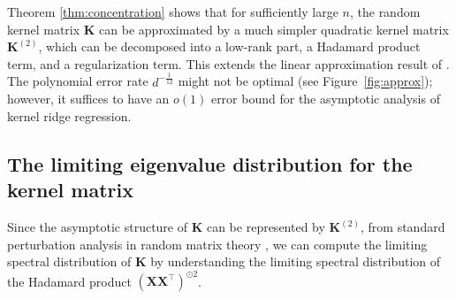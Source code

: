 \documentclass[twoside,11pt]{article}
\def\bK{{\boldsymbol K}}
\def\bX{{\boldsymbol X}}
\renewcommand{\bK}{\boldsymbol{K}}
\newcommand{\1}{\mathbf{1}}
\def\tran{^\top}
\begin{document}
Theorem \ref{thm:concentration} shows that for sufficiently large $n$, the random kernel matrix $\bK$ can be approximated by a much simpler quadratic kernel matrix $\bK^{(2)}$, which can be decomposed into a low-rank part, a Hadamard product term, and a regularization term. This extends the linear approximation result of \cite{el2010spectrum,couillet2016kernel,bartlett2021deep,sahraee2022kernel,ardakan2022equivalence,couillet2022random}. The polynomial error rate $d^{-\frac{1}{12}}$ might not be optimal (see Figure~\ref{fig:approx}); however, it suffices to have an $o(1)$ error bound for the asymptotic analysis of kernel ridge regression.  


\subsection{The limiting eigenvalue distribution for the kernel matrix}
Since the asymptotic structure of $\bK$ can be represented by $\bK^{(2)}$, from standard perturbation analysis in random matrix theory \citep{bai2008large}, we can compute the limiting spectral distribution of $\bK$ by understanding the limiting spectral distribution of the Hadamard product $(\bX\bX\tran)^{\odot 2} $. 
\end{document}
